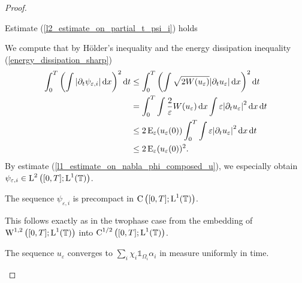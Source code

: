 \begin{proof}
	\begin{description}[wide=0pt]
		\item[Step 1:] Estimate (\ref{l2_estimate_on_partial_t_psi_i}) holds
		
		We compute that by Hölder's inequality and the energy dissipation inequality (\ref{energy_dissipation_sharp})
		\begin{align*}
			\int_{ 0 }^{ T }
				\left(
					\int
						\abs{ \partial_{ t } \psi_{ \varepsilon , i } }
					\dd{ x }
				\right)^{ 2 }
			\dd{ t }
			& \leq
			\int_{ 0 }^{ T }
				\left(
					\int
						\sqrt{ 2 W ( u_{ \varepsilon } ) }
						\abs{ \partial_{ t } u_{ \varepsilon } }
					\dd{ x }
				\right)^{ 2 }
			\dd{ t }
			\\
			& =
			\int_{ 0 }^{ T }
				\int
					\frac{ 2 }{ \varepsilon }
					W ( u_{ \varepsilon } )
				\dd{ x }
				\int
					\varepsilon 
					\abs{ \partial_{ t } u_{ \varepsilon } }^{ 2 }
				\dd{ x }
			\dd{ t }
			\\
			& \leq
			2 \operatorname{E}_{ \varepsilon } ( u_{ \varepsilon } ( 0 ) )
			\int_{ 0 }^{ T }
				\int
					\varepsilon 
					\abs{ \partial_{ t } u_{ \varepsilon } }^{ 2 }
				\dd{ x }
			\dd{ t }
			\\
			& \leq
			2 \operatorname{E}_{ \varepsilon } ( u_{ \varepsilon } ( 0 ) )^{ 2 }.
		\end{align*}
		By estimate (\ref{l1_estimate_on_nabla_phi_composed_u}), we especially 
		obtain $ \psi_{ \varepsilon , i } \in \operatorname{L}^{ 2 } \left( [ 0 , T ] ; 
		\operatorname{L}^{ 1 } ( \operatorname{\mathbb{T}} ) \right) $.
		
		\item[Step 2:] The sequence $ \psi_{ \varepsilon, i } $ is precompact 
		in $ \operatorname{C} \left( [ 0 , T ] ; \operatorname{L}^{ 1 } ( \operatorname{\mathbb{T}} ) \right) $.
		
		This follows exactly as in the twophase case from the embedding of 
		$ \operatorname{W}^{ 1 , 2 } \left( [ 0 , T ] ; \operatorname{L}^{ 1 } ( \operatorname{\mathbb{T}} ) \right) $
		into $ \operatorname{C}^{ 1/2 } \left( [ 0 , T ] ; \operatorname{L}^{ 1 } ( \operatorname{\mathbb{T}} ) \right) $.
		
		\item[Step 3:] The sequence $ u_{ \varepsilon } $ converges to $ \sum_{ i } \chi_{ i } \mathds{ 1 }_{ \Omega_{ i } } \alpha_{ i } $ in measure uniformly in time.
		

\end{description}
\end{proof}
